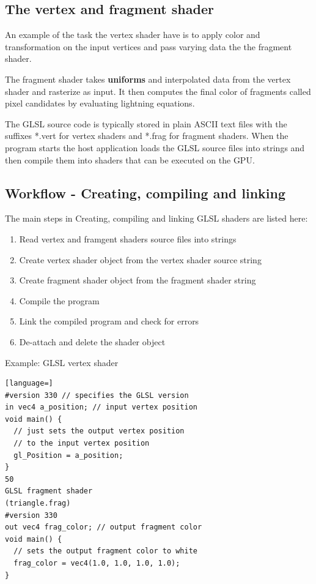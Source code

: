 \subsection*{The vertex and fragment shader }
An example of the task the vertex shader have is to apply color and transformation on the input vertices and pass varying data the the fragment shader. 

The fragment shader takes \textbf{uniforms} and interpolated data from the vertex shader and rasterize as input. It then computes the final color of fragments called pixel candidates by evaluating lightning equations. 

The GLSL source code is typically stored in plain ASCII text files with the suffixes *.vert for vertex shaders and *.frag for fragment shaders. When the program starts the host application loads the GLSL source files into strings and then compile them into shaders that can be executed on the GPU.

\subsection*{Workflow - Creating, compiling and linking}
The main steps in Creating, compiling and linking GLSL shaders are listed here:

\begin{enumerate}
	\item Read vertex and framgent shaders source files into strings
	\item Create vertex shader object from the vertex shader source string
	\item Create fragment shader object from the fragment shader string
	\item Compile the program
	\item Link the compiled program and check for errors
	\item De-attach and delete the shader object
\end{enumerate}


\begin{example}{Example: GLSL vertex shader}
\begin{lstlisting}[language=]
#version 330 // specifies the GLSL version
in vec4 a_position; // input vertex position
void main() {
  // just sets the output vertex position 
  // to the input vertex position 
  gl_Position = a_position;
}
50
GLSL fragment shader 
(triangle.frag)
#version 330
out vec4 frag_color; // output fragment color
void main() {
  // sets the output fragment color to white
  frag_color = vec4(1.0, 1.0, 1.0, 1.0);
}
\end{lstlisting}
\end{example}	

